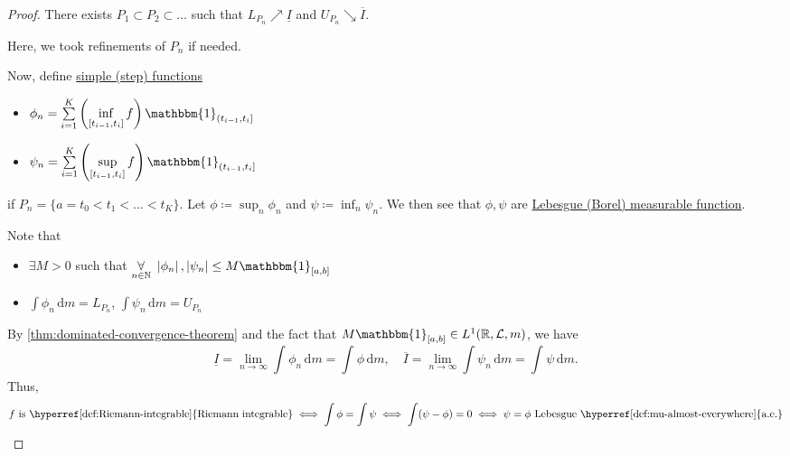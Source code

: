 \begin{proof}
	There exists \(P_1\subset P_2\subset \dots  \) such that \(L_{P_{n}}\nearrow \underline{I} \) and \(U_{P_{n}}\searrow \overline{I} \).
	\begin{note}
		Here, we took refinements of \(P_{n}\) if needed.
	\end{note}
	Now, define \hyperref[def:simple-function]{simple (step) functions}
	\begin{itemize}
		\item \(\phi _{n} = \sum\limits_{i=1}^{K} \left(\inf\limits_{[t_{i-1}, t_{i}]} f \right) \mathbbm{1}_{(t_{i-1}, t_{i}]} \)
		\item \(\psi _{n} = \sum\limits_{i=1}^{K} \left(\sup\limits_{[t_{i-1}, t_{i}]} f \right) \mathbbm{1}_{(t_{i-1}, t_{i}]} \)
	\end{itemize}
	if \(P_{n} = \{a = t_0 < t_1 < \dots < t_{K} \}\). Let \(\phi \coloneqq \sup_n \phi _{n}\) and \(\psi \coloneqq \inf _n \psi _{n}\).
	We then see that \(\phi , \psi \) are \hyperref[def:measurable-function]{Lebesgue (Borel) measurable function}.
	\begin{note}
		Note that
		\begin{itemize}
			\item \(\exists M> 0\) such that \(\underset{n\in\mathbb{N} }{\forall }\ \left\vert \phi _{n} \right\vert, \left\vert \psi _{n} \right\vert \leq M\mathbbm{1}_{[a, b]} \)
			\item \(\int \phi _{n}\,\mathrm{d}m = L_{P_{n}}\), \(\int \psi _{n}\,\mathrm{d}m = U_{P_{n}}\)
		\end{itemize}
	\end{note}
	By \autoref{thm:dominated-convergence-theorem} and the fact that \(M\mathbbm{1}_{[a, b]} \in L^1(\mathbb{R} , \mathcal{L} , m) \),
	we have
	\[
		\underline{I} = \lim\limits_{n \to \infty} \int_{}^{} \phi _{n} \,\mathrm{d}m = \int_{}^{} \phi  \,\mathrm{d}m,\quad
		\overline{I} = \lim\limits_{n \to \infty} \int \psi _n\,\mathrm{d} m = \int_{}^{} \psi  \,\mathrm{d}m.
	\]
	Thus,
	\[
		f \text{ is \hyperref[def:Riemann-integrable]{Riemann integrable}}
		\iff \int \phi = \int \psi
		\iff \int (\psi - \phi ) = 0
		\iff \psi = \phi \text{ Lebesgue \hyperref[def:mu-almost-everywhere]{a.e.}}
	\]
\end{proof}

